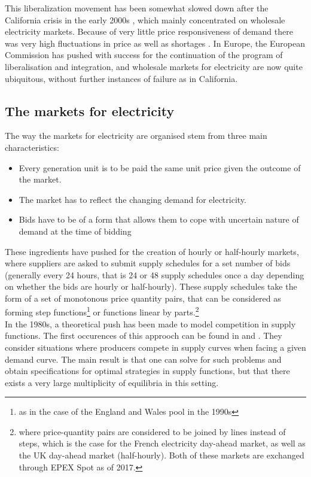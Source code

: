This liberalization movement has been somewhat slowed down after the California crisis in the early 2000s \cite{jamasb2005electricity}, which mainly concentrated on wholesale electricity markets. Because of very little price responsiveness of demand there was very high fluctuations in price as well as shortages \cite{borenstein2002trouble}. In Europe, the European Commission has pushed with success for the continuation of the program of liberalisation and integration, and wholesale markets for electricity are now quite ubiquitous, without further instances of failure as in California. 

\subsection*{The markets for electricity}
The way the markets for electricity are organised stem from three main characteristics:
\begin{itemize}
\item Every generation unit is to be paid the same unit price given the outcome of the market.
\item The market has to reflect the changing demand for electricity.
\item Bids have to be of a form that allows them to cope with uncertain nature of demand at the time of bidding
\end{itemize}

These ingredients have pushed for the creation of hourly or half-hourly markets, where suppliers are asked to submit supply schedules for a set number of bids (generally every 24 hours, that is 24 or 48 supply schedules once a day depending on whether the bids are hourly or half-hourly). These supply schedules take the form of a set of monotonous price quantity pairs, that can be considered as forming step functions\footnote{as in the case of the England and Wales pool in the 1990s} or functions linear by parts.\footnote{where price-quantity pairs are considered to be joined by lines instead of steps, which is the case for the French electricity day-ahead market, as well as the UK day-ahead market (half-hourly). Both of these markets are exchanged through EPEX Spot as of 2017.}\\

In the 1980s, a theoretical push has been made to model competition in supply functions. The first occurences of this approoch can be found in \cite{grossman1981nash} and \cite{hart1982imperfect}. They consider situations where producers compete in supply curves when facing a given demand curve. The main result is that one can solve for such problems and obtain specifications for optimal strategies in supply functions, but that there exists a very large multiplicity of equilibria in this setting.\\

